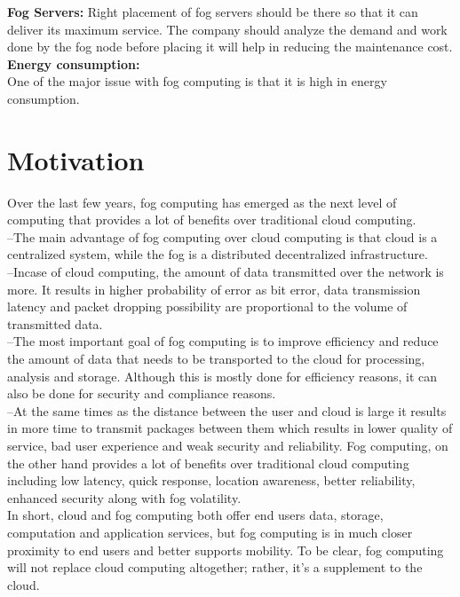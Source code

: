 \documentclass[10pt]{llncs}
\begin{document}
\textbf{Fog Servers:} Right placement of fog servers should be there so that it can deliver its maximum service. The company should analyze the demand and work done by the fog node before placing it will help in reducing the maintenance cost.\\
\textbf{Energy consumption:}\\One of the major issue with fog computing is that it is high in energy consumption. \\

%
\section{Motivation}

Over the last few years, fog computing has emerged as the next level of computing that provides a lot of benefits over traditional cloud computing. \\
--The main advantage of fog computing over cloud computing is that cloud is a centralized system, while the fog is a distributed decentralized infrastructure. \\
--Incase of cloud computing, the amount of data transmitted over the network is more. It results in higher probability of error as bit error, data transmission latency and packet dropping possibility are proportional to the volume of transmitted data. \\
--The most important goal of fog computing is to improve efficiency and reduce the amount of data that needs to be transported to the cloud for processing, analysis and storage. Although this is mostly done for efficiency reasons, it can also be done for security and compliance reasons. \\
--At the same times as the distance between the user and cloud is large it results in more time to transmit packages between them which results in lower quality of service, bad user experience and weak security and reliability. Fog computing, on the other hand provides a lot of benefits over traditional cloud computing including low latency, quick response, location awareness, better reliability, enhanced security along with fog volatility. \\
In short, cloud and fog computing both offer end users data, storage, computation and application services, but fog computing is in much closer proximity to end users and better supports mobility. To be clear, fog computing will not replace cloud computing altogether; rather, it's a supplement to the cloud.
\end{document}
